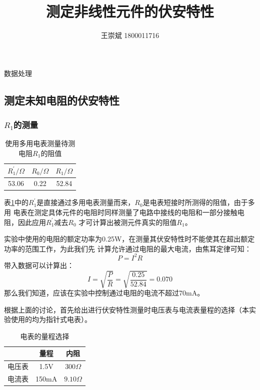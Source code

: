\documentclass[a4paper]{ctexart}
\title{\textbf{测定非线性元件的伏安特性}}
\author{王崇斌 1800011716}
\date{}
\makeatletter
\renewcommand{\section}{\@startsection{section}{1}{0mm}
	{-\baselineskip}{0.5\baselineskip}{\bf\leftline}}
\makeatother
\begin{document}
	\pagestyle{fancy}
	\chead{}
	\rhead{}
	\maketitle
	\thispagestyle{fancy}
	\section{\large{数据处理}}
	\subsection{测定未知电阻的伏安特性}
		\subsubsection{$R_1$的测量}
		\begin{table}[htbp]
			\centering 
			\caption{使用多用电表测量待测电阻$R_1$的阻值}
			\begin{tabular}{ccc}
				\toprule
				$R_1^{'}/\Omega$ & $R_0/\Omega$ & $R_1/\Omega$ \\ 
				\midrule
				53.06 & 0.22 & 52.84\\
				\bottomrule
			\end{tabular}
			\label{R1_first}
		\end{table}
		\par 
		表\ref{R1_first}中的$R_1^{'}$是直接通过多用电表测量而来，$R_0$是电表短接时所测得的阻值，由于多用
		电表在测定具体元件的电阻时同样测量了电路中接线的电阻和一部分接触电阻，因此应用$R_1^{'}$减去$R_0$
		才可计算出被测元件真实的阻值$R_1$。
		\par 
		实验中使用的电阻的额定功率为0.25W，在测量其伏安特性时不能使其在超出额定功率的范围工作，为此我们先
		计算允许通过电阻的最大电流，由焦耳定律可知：
		$$
		P = I^{2}R
		$$
		带入数据可以计算出：
		$$
		I = \sqrt{\frac{P}{R}} = \sqrt{\frac{0.25}{52.84}} = 0.070
		$$
		那么我们知道，应该在实验中控制通过电阻的电流不超过70mA。
		\par 
		根据上面的讨论，首先给出进行伏安特性测量时电压表与电流表量程的选择（本实验使用的均为指针式电表）。
		\begin{table}[htbp]
			\centering
			\caption{电表的量程选择}
			\label{expansion1}
			\begin{tabular}{ccc}
				\toprule
				& 量程 & 内阻\\
				\midrule
				电压表 & 1.5V & $300\Omega$\\
				电流表 & 150mA & $9.10\Omega$\\
				\bottomrule
			\end{tabular}
		\end{table}
\end{document}
